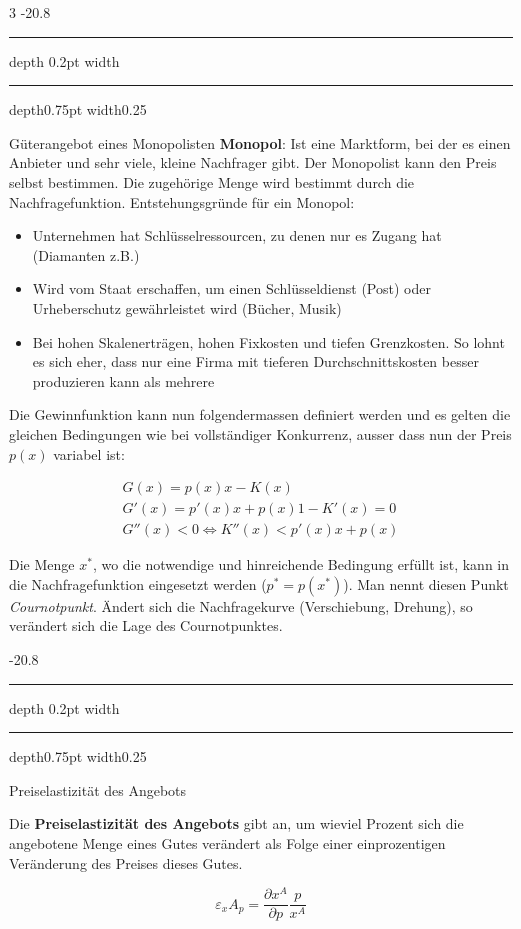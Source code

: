 \documentclass[9pt, landscape, fleqn]{scrartcl}
\makeatletter
\renewcommand{\subsection}{\@startsection{subsection}{1}{0mm}%
{-2\baselineskip}{0.8\baselineskip}%
{\hrule depth 0.2pt width\columnwidth\hrule depth0.75pt
width0.25\columnwidth\vspace*{1.2em}\large\bfseries\rmfamily}}
\makeatother
\begin{document}
\begin{multicols*}{3}
\subsection{Güterangebot eines Monopolisten}
\textbf{Monopol}: Ist eine Marktform, bei der es einen Anbieter und sehr viele, kleine Nachfrager gibt. Der Monopolist kann den Preis selbst bestimmen. Die zugehörige Menge wird bestimmt durch die Nachfragefunktion. Entstehungsgründe für ein Monopol:

\begin{itemize}
    \item Unternehmen hat Schlüsselressourcen, zu denen nur es Zugang hat (Diamanten z.B.)
    \item Wird vom Staat erschaffen, um einen Schlüsseldienst (Post) oder Urheberschutz gewährleistet wird (Bücher, Musik)
    \item Bei hohen Skalenerträgen, hohen Fixkosten und tiefen Grenzkosten. So lohnt es sich eher, dass nur eine Firma mit tieferen Durchschnittskosten besser produzieren kann als mehrere
\end{itemize}

Die Gewinnfunktion kann nun folgendermassen definiert werden und es gelten die gleichen Bedingungen wie bei vollständiger Konkurrenz, ausser dass nun der Preis $p(x)$ variabel ist:

\begin{align}
    G(x) = p(x) x - K(x) \\
    G'(x) = p'(x) x + p(x) 1 - K'(x) = 0\\
    G''(x) < 0 \Leftrightarrow K''(x) < p'(x)x + p(x)
\end{align}

Die Menge $x^*$, wo die notwendige und hinreichende Bedingung erfüllt ist, kann in die Nachfragefunktion eingesetzt werden ($p^* = p(x^*)$). Man nennt diesen Punkt \emph{Cournotpunkt}. Ändert sich die Nachfragekurve (Verschiebung, Drehung), so verändert sich die Lage des Cournotpunktes.



\subsection{Preiselastizität des Angebots}

Die \textbf{Preiselastizität des Angebots} gibt an, um wieviel Prozent sich die angebotene Menge eines Gutes verändert als Folge einer einprozentigen Veränderung des Preises dieses Gutes.

\begin{equation}
    \varepsilon_xA_p = \frac{\partial x^A}{\partial p}\frac{p}{x^A}
\end{equation}


\end{multicols*}
\end{document}
